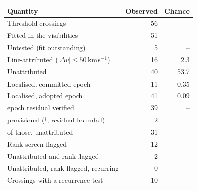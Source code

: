 \begin{tabular}{@{}lrr@{}}
\hline
Quantity & Observed & Chance \\
\hline
Threshold crossings & 56 & -- \\
Fitted in the visibilities & 51 & -- \\
Untested (fit outstanding) & 5 & -- \\
Line-attributed ($|\Delta v|\leq50$\,km\,s$^{-1}$) & 16 & 2.3 \\
Unattributed & 40 & 53.7 \\
Localised, committed epoch & 11 & 0.35 \\
Localised, adopted epoch & 41 & 0.09 \\
\quad epoch residual verified & 39 & -- \\
\quad provisional ($^{\dagger}$, residual bounded) & 2 & -- \\
\quad of those, unattributed & 31 & -- \\
Rank-screen flagged & 12 & -- \\
Unattributed and rank-flagged & 2 & -- \\
Unattributed, rank-flagged, recurring & 0 & -- \\
Crossings with a recurrence test & 10 & -- \\
\hline
\end{tabular}

